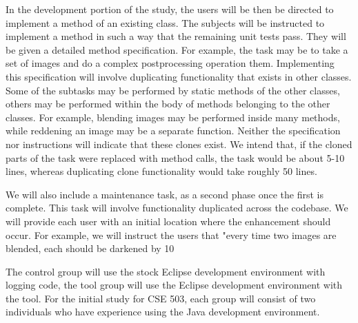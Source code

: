 \documentclass[preprint,10pt]{sigplanconf}
\newcommand{\todo}[1]{{\bfseries [[#1]]}}
\begin{document}
In the development portion of the study, the users will be then be directed
to implement a method of an existing class.     The subjects will be instructed to implement a method 
in such a way that the remaining unit tests pass.  They will be given a detailed 
 method specification. For example, the task may be to take a set of images and do a complex postprocessing operation them.  Implementing this specification will involve
 duplicating functionality that exists in other classes.  Some of the subtasks may be 
performed by static methods of the other classes, others may be performed 
within the body of methods belonging to the other classes. For example, blending images may be performed inside many methods, while reddening an image may be a separate function.
 Neither the specification
nor instructions will indicate that these clones exist.  We intend that, if the cloned parts of the 
task were replaced with method calls, the task would be about 5-10 lines, whereas duplicating clone functionality would take roughly 50 lines.

We will also include a maintenance task, as a second phase once the first is complete.  This task will involve functionality duplicated across the codebase.  We will provide each user with an initial location where the enhancement should occur.  For example, we will instruct the users that "every time two images are blended, each should be darkened by 10%


The control group will use the stock Eclipse development
environment with logging code, the tool group will use the Eclipse development
environment with the tool. For the initial study for CSE 503, each
group will consist of two individuals who have experience using the
Java development environment.  
\end{document}
